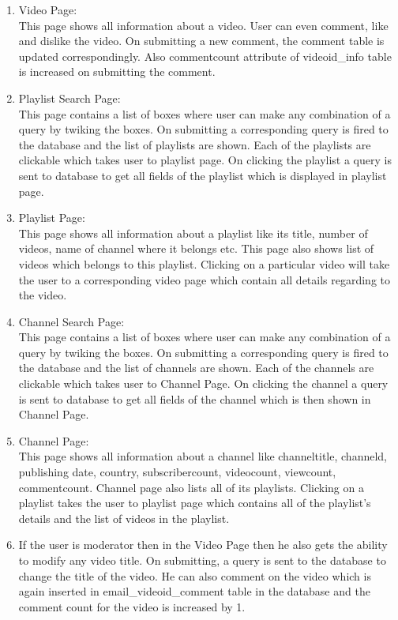 \documentclass[10pt]{article}
\begin{document}
\begin{enumerate}
\begin{enumerate}
			\item Video Page:\\
			This page shows all information about a video. User can even comment, like and dislike the video. On submitting a new comment, the comment table is updated correspondingly. Also commentcount attribute of videoid\_info table is increased on submitting the comment.
			\item Playlist Search Page: \\
			This page contains a list of boxes where user can make any combination of a query by twiking the boxes. On submitting a corresponding query is fired to the database and the list of playlists are shown. Each of the playlists are clickable which takes user to playlist page. On clicking the playlist a query is sent to database to get all fields of the playlist which is displayed in playlist page.
			\item Playlist Page:\\
			This page shows all information about a playlist like its title, number of videos, name of channel where it belongs etc. This page also shows list of videos which belongs to this playlist. Clicking on a particular video will take the user to a corresponding video page which contain all details regarding to the video.
			\item Channel Search Page: \\
			This page contains a list of boxes where user can make any combination of a query by twiking the boxes. On submitting a corresponding query is fired to the database and the list of channels are shown. Each of the channels are clickable which takes user to Channel Page. On clicking the channel a query is sent to database to get all fields of the channel which is then shown in Channel Page.
			\item Channel Page:\\
			This page shows all information about a channel like channeltitle, channeld, publishing date, country, subscribercount, videocount, viewcount, commentcount. Channel page also lists all of its playlists. Clicking on a playlist takes the user to playlist page which contains all of the playlist's details and the list of videos in the playlist.
			\item If the user is moderator then in the Video Page then he also gets the ability to modify any video title. On submitting, a query is sent to the database to change the title of the video. He can also comment on the video which is again inserted in email\_videoid\_comment table in the database and the comment count for the video is increased by 1. 

\end{enumerate}
\end{enumerate}
\end{document}
